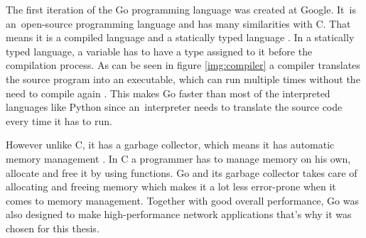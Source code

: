 The first iteration of the Go programming language was created at Google. It~is an~open-source programming language and has many similarities with C. That means it is a compiled language and a statically typed language \cite{Donovan2016}. In a statically typed language, a variable has to have a type assigned to it before the compilation process. As can be seen in figure \ref{img:compiler} a compiler translates the source program into an executable, which can run multiple times without the need to compile again \cite{Aho2006}. This makes Go faster than most of the interpreted languages like Python since an~interpreter needs to translate the source code every time it has to run.


However unlike C, it has a garbage collector, which means it has automatic memory management \cite{Donovan2016}. In C a programmer has to manage memory on his own, allocate and free it by using functions. Go and its garbage collector takes care of allocating and freeing memory which makes it a lot less error-prone when it comes to memory management. Together with good overall performance, Go was also designed to make high-performance network applications that's why it was chosen for this thesis.
